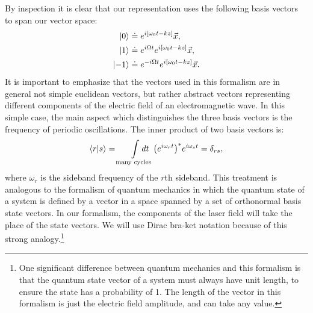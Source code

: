 By inspection it is clear that our representation uses the following basis vectors to span our vector space:
\begin{align}
\left| 0 \right>&\doteq e^{i[\omega_0 t-kz]}\vec{x}\notag, \\
\left| 1 \right>&\doteq e^{i\Omega t}e^{i[\omega_0 t-kz]}\vec{x}, \\
\left| -1 \right>&\doteq e^{-i\Omega t}e^{i[\omega_0 t-kz]}\vec{x}\notag.
\end{align}
It is important to emphasize that the vectors used in this formalism are in general not simple euclidean vectors, but rather abstract vectors representing different components of the electric field of an electromagnetic wave. %
In this simple case, the main aspect which distinguishes the three basis vectors is the frequency of periodic oscillations. %
The inner product of two basis vectors is:
\[
\inprod{r}{s} = \int\limits_{\text{many cycles}}\! \! \! \! \! \! \! \! \!
dt \; \: {\left( e^{i\omega_{r}t}\right)^*}e^{i\omega_{s}t} = \delta_{rs},
\]
where $\omega_r$ is the sideband frequency of the $r$th sideband. %
This treatment is analogous to the formalism of quantum mechanics in which the quantum state of a system is defined by a vector in a space spanned by a set of orthonormal basis state vectors. %
In our formalism, the components of the laser field will take the place of the state vectors. %
We will use Dirac bra-ket notation because of this strong analogy.\footnote{One significant difference between quantum mechanics and this formalism is that the quantum state vector of a system must always have unit length, to ensure the state has a probability of 1. %
The length of the vector in this formalism is just the electric field amplitude, and can take any value.}

